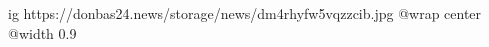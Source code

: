  
 
 
 
 

\ifcmt
  ig https://donbas24.news/storage/news/dm4rhyfw5vqzzcib.jpg
  @wrap center
  @width 0.9
\fi
